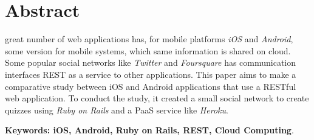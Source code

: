 \chapter*{Abstract}
\label{chp:abstract}%
\thispagestyle{empty}

\setcounter{footnote}{0}

 great number of web applications has, for mobile platforms \emph{iOS} and \emph{Android}, some version for mobile systems, which same information is shared on cloud. Some popular social networks like \emph{Twitter} and \emph{Foursquare} has communication interfaces REST as a service to other applications. This paper aims to make a comparative study between iOS and Android applications that use a RESTful web application. To conduct the study, it created a small social network to create quizzes using \emph{Ruby on Rails} and a PaaS service like \emph{Heroku}.

\noindent \textbf{Keywords: iOS, Android, Ruby on Rails, REST, Cloud Computing}.


